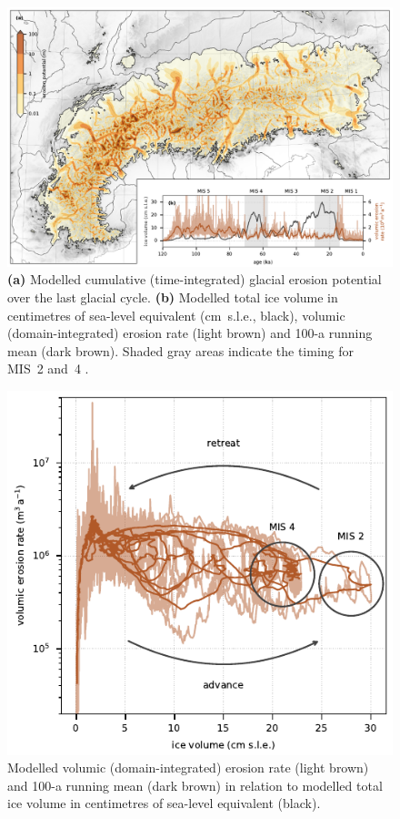 \documentclass[utf8]{article}
\begin{document}
    \begin{figure}
      \centerline{\includegraphics{alpero_cumulative}}
      \caption{%
        \textbf{(a)} Modelled cumulative (time-integrated) glacial erosion
          potential over the last glacial cycle.
        \textbf{(b)} Modelled total ice volume in centimetres of sea-level
          equivalent (cm~s.l.e., black), volumic (domain-integrated) erosion
          rate (light brown) and 100-a running mean (dark brown). Shaded gray
          areas indicate the timing for MIS~2 and~4
          \citep{Lisiecki.Raymo.2005}.} \label{fig:cumulative}
    \end{figure}

    \begin{figure}
      \centerline{\includegraphics{alpero_evolution}}
      \caption{%
        Modelled volumic (domain-integrated) erosion rate (light brown) and 100-a
        running mean (dark brown) in relation to modelled total ice volume in
        centimetres of sea-level equivalent (black).}
      \label{fig:evolution}
    \end{figure}
\end{document}
